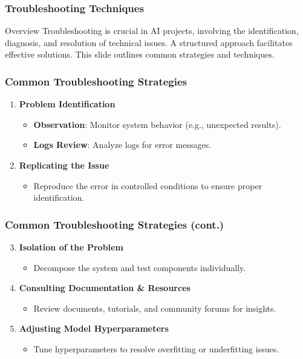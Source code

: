 \documentclass[aspectratio=169]{beamer}
\begin{document}
\begin{frame}
    \frametitle{Troubleshooting Techniques}
    \begin{block}{Overview}
        Troubleshooting is crucial in AI projects, involving the identification, diagnosis, and resolution of technical issues. A structured approach facilitates effective solutions. This slide outlines common strategies and techniques.
    \end{block}
\end{frame}

\begin{frame}
    \frametitle{Common Troubleshooting Strategies}
    \begin{enumerate}
        \item \textbf{Problem Identification}
            \begin{itemize}
                \item \textbf{Observation}: Monitor system behavior (e.g., unexpected results).
                \item \textbf{Logs Review}: Analyze logs for error messages.
            \end{itemize}
        \item \textbf{Replicating the Issue}
            \begin{itemize}
                \item Reproduce the error in controlled conditions to ensure proper identification.
            \end{itemize}
    \end{enumerate}
\end{frame}

\begin{frame}
    \frametitle{Common Troubleshooting Strategies (cont.)}
    \begin{enumerate}
        \setcounter{enumi}{2}
        \item \textbf{Isolation of the Problem}
            \begin{itemize}
                \item Decompose the system and test components individually.
            \end{itemize}
        \item \textbf{Consulting Documentation \& Resources}
            \begin{itemize}
                \item Review documents, tutorials, and community forums for insights.
            \end{itemize}
        \item \textbf{Adjusting Model Hyperparameters}
            \begin{itemize}
                \item Tune hyperparameters to resolve overfitting or underfitting issues.
            \end{itemize}
    \end{enumerate}
\end{frame}
\end{document}

